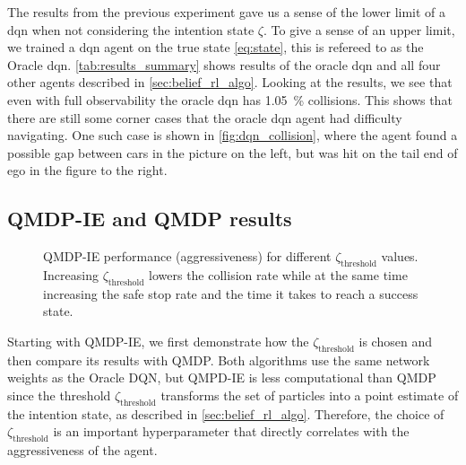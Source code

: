 The results from the previous experiment gave us a sense of the lower limit of a \gls{dqn} when not considering the intention state $\zeta$. To give a sense of an upper limit, we trained a \gls{dqn} agent on the true state \eqref{eq:state}, this is refereed to as the Oracle \gls{dqn}. 
\ref{tab:results_summary} shows results of the oracle \gls{dqn} and all four other agents described in \ref{sec:belief_rl_algo}. 
Looking at the results, we see that even with full observability the oracle \gls{dqn} has \SI{1.05}{\percent} collisions. This shows that there are still some corner cases that the oracle \gls{dqn} agent had difficulty navigating. One such case is shown in \ref{fig:dqn_collision}, where the agent found a possible gap between cars in the picture on the left, but was hit on the tail end of ego in the figure to the right. 

\subsection{QMDP-IE and QMDP results}
\begin{figure}[!t]
    \centering
        
        \vspace{-0.8cm}
        \caption{QMDP-IE performance (aggressiveness) for different $\zeta_\text{threshold}$ values. Increasing $\zeta_\text{threshold}$ lowers the collision rate while at the same time increasing the safe stop rate and the time it takes to reach a success state.}
    \label{fig:intent_threshold}
\end{figure}
Starting with QMDP-IE, we first demonstrate how the $\zeta_\text{threshold}$ is chosen and then compare its results with QMDP. Both algorithms use the same network weights as the Oracle DQN, but QMPD-IE is less computational than QMDP since the threshold $\zeta_\text{threshold}$ transforms the set of particles into a point estimate of the intention state, as described in \ref{sec:belief_rl_algo}. Therefore, the choice of $\zeta_\text{threshold}$ is an important hyperparameter that directly correlates with the aggressiveness of the agent.

